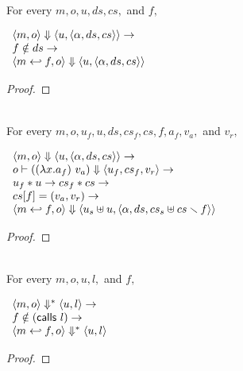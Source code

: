 \begin{lemma}
  \label{lem-inlinedmm-substep-intact}
  \mbox{}\\
  For every $m, o, u, ds, cs,$ and $f,$
  \begin{center}
    \begin{math}
      \begin{array}{l}
        \langle m, o \rangle \Downarrow \langle u, \langle \alpha, ds, cs \rangle \rangle \to \\
        f \notin ds \to \\
        \langle m \hookleftarrow{} f, o \rangle \Downarrow \langle u, \langle \alpha, ds, cs \rangle \rangle
      \end{array}
    \end{math}
  \end{center}
\end{lemma}
\begin{proof}
\end{proof}

\begin{lemma}
  \label{lem-inlinedmm-substep-call}
  \mbox{}\\
  For every $m, o, u_f, u, ds, cs_f, cs, f, a_f, v_a,$ and $v_r,$
  \begin{center}
    \begin{math}
      \begin{array}{l}
        \langle m, o \rangle \Downarrow \langle u, \langle \alpha, ds, cs \rangle \rangle \to \\
        o |- ((\lambda x.a_f)\ v_a) \Downarrow \langle u_f, cs_f, v_r \rangle \to \\
        u_f \ast u \to cs_f \ast cs \to \\
        cs[f] = (v_a, v_r) \to \\
        \langle m \hookleftarrow{} f, o \rangle \Downarrow \langle u_s \uplus u, \langle \alpha, ds, cs_s \uplus cs \smallsetminus{} f \rangle \rangle
      \end{array}
    \end{math}
  \end{center}
\end{lemma}
\begin{proof}
\end{proof}

\begin{lemma}
  \label{lem-inlinedmm-intact}
  \mbox{}\\
  For every $m, o, u, l,$ and $f,$
  \begin{center}
    \begin{math}
      \begin{array}{l}
        \langle m, o \rangle \Downarrow^{\ast} \langle u, l \rangle \to \\
        f \notin (\textsf{calls}\ l) \to \\
        \langle m \hookleftarrow{} f, o \rangle \Downarrow^{\ast} \langle u, l \rangle
      \end{array}
    \end{math}
  \end{center}
\end{lemma}
\begin{proof}
\end{proof}

